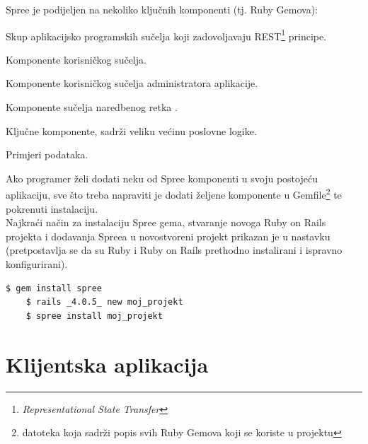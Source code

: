 Spree je podijeljen na nekoliko ključnih komponenti (tj. Ruby Gemova):
\begin{description}[style=nextline]
    \item[spree\_api] Skup aplikacijsko programskih sučelja koji zadovoljavaju REST\footnote{\textit{Representational State Transfer}} principe.
    \item[spree\_frontend] Komponente korisničkog sučelja.
    \item[spree\_backend] Komponente korisničkog sučelja administratora aplikacije.
    \item[spree\_cmd] Komponente sučelja naredbenog retka .
    \item[spree\_core] Ključne komponente, sadrži veliku većinu poslovne logike.
    \item[spree\_sample] Primjeri podataka.
\end{description}

Ako programer želi dodati neku od Spree komponenti u svoju postojeću aplikaciju, sve što treba napraviti je dodati željene komponente u Gemfile\footnote{datoteka koja sadrži popis svih Ruby Gemova koji se koriste u projektu} te pokrenuti instalaciju.
\\
Najkraći način za instalaciju Spree gema, stvaranje novoga Ruby on Rails projekta i dodavanja Spreea u novostvoreni projekt prikazan je u nastavku (pretpostavlja se da su Ruby i Ruby on Rails prethodno instalirani i ispravno konfigurirani).
\\

\begin{lstlisting}[language=bash, frame=single]
    $ gem install spree
    $ rails _4.0.5_ new moj_projekt
    $ spree install moj_projekt
\end{lstlisting}



\section*{Klijentska aplikacija}

